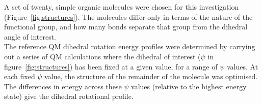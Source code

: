\documentclass[11pt, oneside]{article}   	%
\begin{document}
A set of twenty, simple organic molecules were chosen for this investigation (Figure~\ref{fig:structures}). The molecules differ only in terms of the nature of the functional group, and how many bonds separate that group from the dihedral angle of interest.\\
The reference QM dihedral rotation energy profiles were determined by carrying out a series of QM calculations where the dihedral of interest ($\psi$ in figure~\ref{fig:structures}) has been fixed at a given value, for a range of $\psi$ values. At each fixed $\psi$ value, the structure of the remainder of the molecule was optimised. The differences in energy across these $\psi$ values (relative to the highest energy state) give the dihedral rotational profile. 
\end{document}
